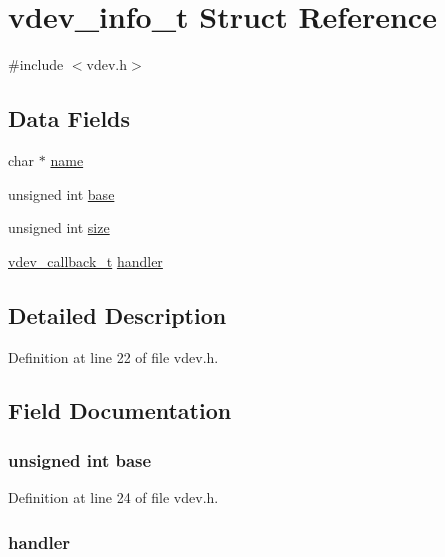 \hypertarget{structvdev__info__t}{\section{vdev\-\_\-info\-\_\-t \-Struct \-Reference}
\label{structvdev__info__t}
}


{\ttfamily \#include $<$vdev.\-h$>$}

\subsection*{\-Data \-Fields}
\begin{DoxyCompactItemize}
\item 
char $\ast$ \hyperlink{structvdev__info__t_a5ac083a645d964373f022d03df4849c8}{name}
\item 
unsigned int \hyperlink{structvdev__info__t_a2e013c2c6e8010c8116c6f56813df57b}{base}
\item 
unsigned int \hyperlink{structvdev__info__t_aac913b3a1f6ef005d66bf7a84428773e}{size}
\item 
\hyperlink{vdev_8h_aeaabc2529ee76704e7c51336e1caeec4}{vdev\-\_\-callback\-\_\-t} \hyperlink{structvdev__info__t_a42fd42fb5449cd6a28b4dc22e97b136a}{handler}
\end{DoxyCompactItemize}


\subsection{\-Detailed \-Description}


\-Definition at line 22 of file vdev.\-h.



\subsection{\-Field \-Documentation}
\hypertarget{structvdev__info__t_a2e013c2c6e8010c8116c6f56813df57b}{
\subsubsection[{base}]{\setlength{\rightskip}{0pt plus 5cm}unsigned int {\bf base}}}\label{structvdev__info__t_a2e013c2c6e8010c8116c6f56813df57b}


\-Definition at line 24 of file vdev.\-h.

\hypertarget{structvdev__info__t_a42fd42fb5449cd6a28b4dc22e97b136a}{
\subsubsection[{handler}]{ {\bf handler}}}\label{structvdev__info__t_a42fd42fb5449cd6a28b4dc22e97b136a}



